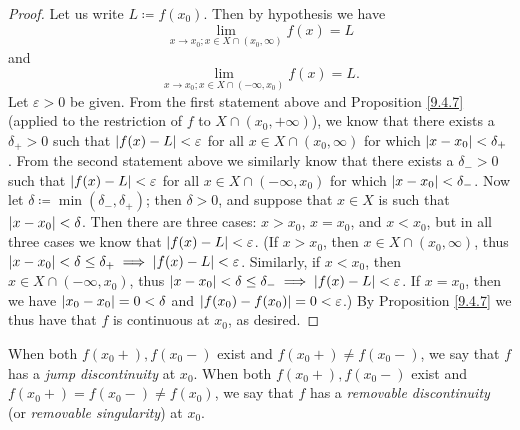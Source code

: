 \begin{proof}
    Let us write \(L \coloneqq f(x_0)\).
    Then by hypothesis we have
    \[
        \lim_{x \to x_0 ; x \in X \cap (x_0, \infty)} f(x) = L
    \]
    and
    \[
        \lim_{x \to x_0 ; x \in X \cap (-\infty, x_0)} f(x) = L.
    \]
    Let \(\varepsilon > 0\) be given.
    From the first statement above and Proposition \ref{9.4.7} (applied to the restriction of \(f\) to \(X \cap (x_0, +\infty)\)), we know that there exists a \(\delta_+ > 0\) such that \(\abs*{f(x) - L} < \varepsilon\) for all \(x \in X \cap(x_0, \infty)\) for which \(\abs*{x - x_0} < \delta_+\).
    From the second statement above we similarly know that there exists a \(\delta_- > 0\) such that \(\abs*{f(x) - L} < \varepsilon\) for all \(x \in X \cap (-\infty, x_0)\) for which \(\abs*{x - x_0} < \delta_-\).
    Now let \(\delta \coloneqq \min(\delta_-, \delta_+)\);
    then \(\delta > 0\), and suppose that \(x \in X\) is such that \(\abs*{x - x_0} < \delta\).
    Then there are three cases:
    \(x > x_0\), \(x = x_0\), and \(x < x_0\), but in all three cases we know that \(\abs*{f(x) - L} < \varepsilon\).
    (If \(x > x_0\), then \(x \in X \cap (x_0, \infty)\), thus \(\abs*{x - x_0} < \delta \leq \delta_+ \implies \abs*{f(x) - L} < \varepsilon\).
    Similarly, if \(x < x_0\), then \(x \in X \cap (-\infty, x_0)\), thus \(\abs*{x - x_0} < \delta \leq \delta_- \implies \abs*{f(x) - L} < \varepsilon\).
    If \(x = x_0\), then we have \(\abs*{x_0 - x_0} = 0 < \delta\) and \(\abs*{f(x_0) - f(x_0)} = 0 < \varepsilon\).)
    By Proposition \ref{9.4.7} we thus have that \(f\) is continuous at \(x_0\), as desired.
\end{proof}

\begin{note}
    When both \(f(x_0+), f(x_0-)\) exist and \(f(x_0+) \neq f(x_0-)\), we say that \(f\) has a \emph{jump discontinuity} at \(x_0\).
    When both \(f(x_0+), f(x_0-)\) exist and \(f(x_0+) = f(x_0-) \neq f(x_0)\), we say that \(f\) has a \emph{removable discontinuity} (or \emph{removable singularity}) at \(x_0\).
\end{note}

